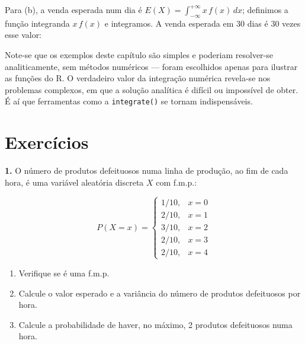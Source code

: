 \documentclass[
  portuguese,
  11pt,
  openany]{book}
\newenvironment{Shaded}{\begin{snugshade}}{\end{snugshade}}
\newcommand{\CommentTok}[1]{\textcolor[rgb]{0.56,0.35,0.01}{\textit{#1}}}
\newcommand{\ControlFlowTok}[1]{\textcolor[rgb]{0.13,0.29,0.53}{\textbf{#1}}}
\newcommand{\DecValTok}[1]{\textcolor[rgb]{0.00,0.00,0.81}{#1}}
\newcommand{\DocumentationTok}[1]{\textcolor[rgb]{0.56,0.35,0.01}{\textbf{\textit{#1}}}}
\newcommand{\FunctionTok}[1]{\textcolor[rgb]{0.13,0.29,0.53}{\textbf{#1}}}
\newcommand{\NormalTok}[1]{#1}
\newcommand{\OtherTok}[1]{\textcolor[rgb]{0.56,0.35,0.01}{#1}}
\newcommand{\SpecialCharTok}[1]{\textcolor[rgb]{0.81,0.36,0.00}{\textbf{#1}}}
\providecommand{\tightlist}{%
  \setlength{\itemsep}{0pt}\setlength{\parskip}{0pt}}
\begin{document}
Para (b), a venda esperada num dia é \(E(X) = \int_{-\infty}^{+\infty} x\, f(x)\,dx\);
definimos a função integranda \(x\,f(x)\) e integramos. A venda esperada em 30 dias é 30
vezes esse valor:

\begin{Shaded}
\end{Shaded}

Note-se que os exemplos deste capítulo são simples e poderiam resolver-se
analiticamente, sem métodos numéricos --- foram escolhidos apenas para ilustrar as
funções do R. O verdadeiro valor da integração numérica revela-se nos problemas
complexos, em que a solução analítica é difícil ou impossível de obter. É aí que
ferramentas como a \texttt{integrate()} se tornam indispensáveis.

\section{Exercícios}\label{exercuxedcios-23}

\textbf{1.} O número de produtos defeituosos numa linha de produção, ao fim de cada hora, é
uma variável aleatória discreta \(X\) com f.m.p.:

\[P(X = x) = \begin{cases}
1/10, & x = 0 \\ 2/10, & x = 1 \\ 3/10, & x = 2 \\ 2/10, & x = 3 \\ 2/10, & x = 4
\end{cases}\]

\begin{enumerate}
\def\labelenumi{(\alph{enumi})}
\tightlist
\item
  Verifique se é uma f.m.p.
\item
  Calcule o valor esperado e a variância do número de produtos defeituosos por hora.
\item
  Calcule a probabilidade de haver, no máximo, 2 produtos defeituosos numa hora.
\end{enumerate}
\end{document}

